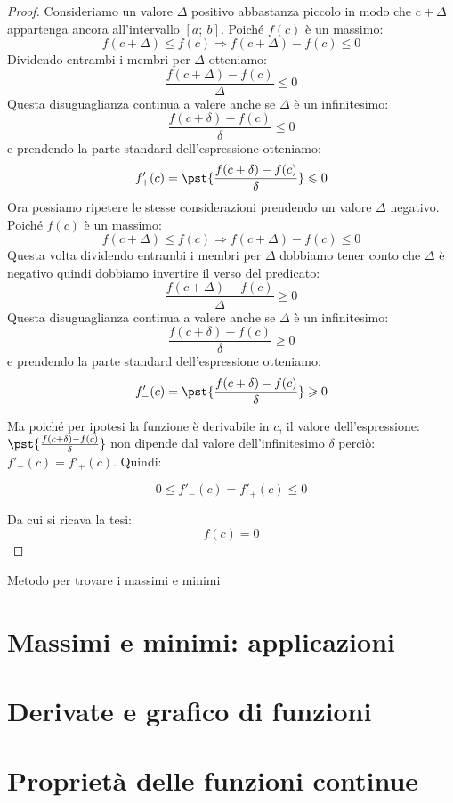 \begin{proof}
Consideriamo un valore \(\Delta\) positivo abbastanza piccolo 
in modo che \(c+\Delta\) appartenga ancora all'intervallo \([a;~b]\).
Poiché \(f(c)\) è un massimo: 
\[f(c+\Delta) \leqslant f(c) \Rightarrow f(c+\Delta) - f(c) \leqslant 0\]
Dividendo entrambi i membri per \(\Delta\) otteniamo:
\[\frac{f(c+\Delta) - f(c)}{\Delta} \leqslant 0\]
Questa disuguaglianza continua a valere anche se \(\Delta\) è un infinitesimo:
\[\frac{f(c+\delta) - f(c)}{\delta} \leqslant 0\] 
e prendendo la parte standard dell'espressione otteniamo:
\[f'_+(c)=\pst{\frac{f(c+\delta) - f(c)}{\delta}} \leqslant 0\] 
Ora possiamo ripetere le stesse considerazioni prendendo un valore \(\Delta\) 
negativo.
Poiché \(f(c)\) è un massimo: 
\[f(c+\Delta) \leqslant f(c) \Rightarrow f(c+\Delta) - f(c) \leqslant 0\]
Questa volta dividendo entrambi i membri per \(\Delta\) dobbiamo tener conto 
che \(\Delta\) è negativo quindi dobbiamo invertire il verso del predicato:
\[\frac{f(c+\Delta) - f(c)}{\Delta} \geqslant 0\]
Questa disuguaglianza continua a valere anche se \(\Delta\) è un infinitesimo:
\[\frac{f(c+\delta) - f(c)}{\delta} \geqslant 0\] 
e prendendo la parte standard dell'espressione otteniamo:
\[f'_-(c)=\pst{\frac{f(c+\delta) - f(c)}{\delta}} \geqslant 0\] 

Ma poiché per ipotesi la funzione è derivabile in \(c\), il valore 
dell'espressione: \(\pst{\frac{f(c+\delta) - f(c)}{\delta}}\) non dipende dal 
valore dell'infinitesimo \(\delta\) perciò: \(f'_-(c) = f'_+(c)\). 
Quindi:

\[0 \leqslant f'_-(c) = f'_+(c) \leqslant 0\]

Da cui si ricava la tesi:
\[f(c) = 0\]

\end{proof}

Metodo per trovare i massimi e minimi

\section{Massimi e minimi: applicazioni}
\label{sec:cont_applicazioni}

\section{Derivate e grafico di funzioni}
\label{sec:cont_derivate_studiof}

\section{Proprietà delle funzioni continue}
\label{sec:cont_proprieta}

